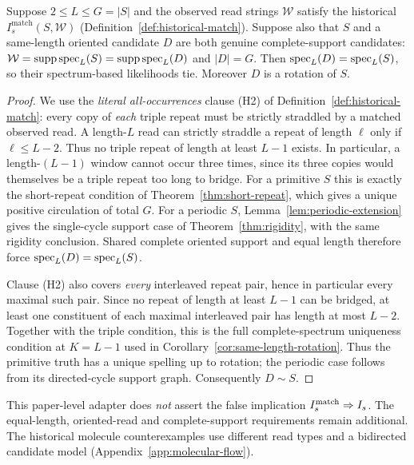 \begin{corollary}
\label{cor:historical-oriented-same-length}
Suppose $2\le L\le G=|S|$ and the observed read strings
$\mathcal W$ satisfy the historical
$I_s^{\mathrm{match}}(S,\mathcal W)$
(Definition~\ref{def:historical-match}).
Suppose also that $S$ and a same-length oriented candidate $D$
are both genuine complete-support candidates:
$\mathcal W=\operatorname{supp}\operatorname{spec}_L(S)=\operatorname{supp}\operatorname{spec}_L(D)$ and $|D|=G$.
Then $\operatorname{spec}_L(D)=\operatorname{spec}_L(S)$, so their spectrum-based
likelihoods tie. Moreover $D$ is a rotation of $S$.
\end{corollary}
\begin{proof}
We use the \emph{literal all-occurrences} clause (H2) of
Definition~\ref{def:historical-match}: every copy of
\emph{each} triple repeat must be strictly straddled by a
matched observed read. A length-$L$ read can strictly
straddle a repeat of length $\ell$ only if $\ell\le L-2$.
Thus no triple repeat of length at least $L-1$ exists.
In particular, a length-$(L-1)$ window cannot occur three
times, since its three copies would themselves be a
triple repeat too long to bridge. For a primitive $S$ this
is exactly the short-repeat condition of
Theorem~\ref{thm:short-repeat}, which gives a unique
positive circulation of total $G$. For a periodic $S$,
Lemma~\ref{lem:periodic-extension} gives the single-cycle
support case of Theorem~\ref{thm:rigidity}, with the same
rigidity conclusion. Shared complete oriented support
and equal length therefore force
$\operatorname{spec}_L(D)=\operatorname{spec}_L(S)$.

Clause (H2) also covers \emph{every} interleaved repeat
pair, hence in particular every maximal such pair.
Since no repeat of length at least $L-1$ can be bridged,
at least one constituent of each maximal interleaved
pair has length at most $L-2$. Together with the triple
condition, this is the full complete-spectrum uniqueness
condition at $K=L-1$ used in
Corollary~\ref{cor:same-length-rotation}. Thus the
primitive truth has a unique spelling up to rotation;
the periodic case follows from its directed-cycle
support graph. Consequently $D\sim S$.
\end{proof}

This paper-level adapter does \emph{not} assert the false
implication $I_s^{\mathrm{match}}\Rightarrow I_s$.
The equal-length, oriented-read and complete-support
requirements remain additional. The historical molecule
counterexamples use different read types and a bidirected
candidate model (Appendix~\ref{app:molecular-flow}).

